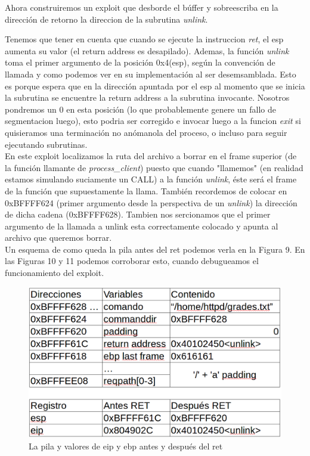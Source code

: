 \documentclass[12pt]{article}
\begin{document}
Ahora construiremos un exploit que desborde el búffer y sobreescriba en la dirección de retorno la direccion de la subrutina \textit{unlink}.

Tenemos que tener en cuenta que cuando se ejecute la instruccion \textit{ret}, el esp aumenta su valor (el return address es desapilado). Ademas, la función \textit{unlink} toma el primer argumento de la posición 0x4(esp), según la convención de llamada y como podemos ver en su implementación al ser desemsamblada. Esto es porque espera que en la dirección apuntada por el esp al momento que se inicia la subrutina se encuentre la return address a la subrutina invocante. Nosotros pondremos un 0 en esta posición (lo que probablemente genere un fallo de segmentacion luego), esto podria ser corregido e invocar luego a la funcion \textit{exit} si quisieramos una terminación no anómanola del proceso, o incluso para seguir ejecutando subrutinas. \\

En este exploit localizamos la ruta del archivo a borrar en el frame superior (de la función llamante de \textit{process\_client}) puesto que cuando "llamemos" (en realidad estamos simulando suciamente un CALL) a la función \textit{unlink}, éste será el frame de la función que supuestamente la llama. También recordemos de colocar en 0xBFFFF624 (primer argumento desde la perspectiva de un \textit{unlink}) la dirección de dicha cadena (0xBFFFF628). Tambien nos sercionamos que el primer argumento de la llamada a unlink esta correctamente colocado y apunta al archivo que queremos borrar.\\

Un esquema de como queda la pila antes del ret podemos verla en la Figura 9. En las Figuras 10 y 11 podemos corroborar esto, cuando debugueamos el funcionamiento del exploit.

\begin{figure}[htp]
\centering
\includegraphics[scale=0.35]{./imagenes/esquema2.png}
\caption{La pila y valores de eip y ebp antes y después del ret}
\end{figure} 
\end{document}
